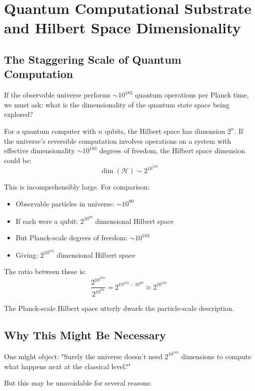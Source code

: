 \section{Quantum Computational Substrate and Hilbert Space Dimensionality}

\subsection{The Staggering Scale of Quantum Computation}

If the observable universe performs $\sim 10^{183}$ quantum operations per Planck time, we must ask: what is the dimensionality of the quantum state space being explored?

For a quantum computer with $n$ qubits, the Hilbert space has dimension $2^n$. If the universe's reversible computation involves operations on a system with effective dimensionality $\sim 10^{183}$ degrees of freedom, the Hilbert space dimension could be:
\begin{equation}
\dim(\mathcal{H}) \sim 2^{10^{183}}
\end{equation}

This is incomprehensibly large. For comparison:
\begin{itemize}
\item Observable particles in universe: $\sim 10^{80}$
\item If each were a qubit: $2^{10^{80}}$ dimensional Hilbert space
\item But Planck-scale degrees of freedom: $\sim 10^{183}$ 
\item Giving: $2^{10^{183}}$ dimensional Hilbert space
\end{itemize}

The ratio between these is:
\begin{equation}
\frac{2^{10^{183}}}{2^{10^{80}}} = 2^{10^{183} - 10^{80}} \approx 2^{10^{183}}
\end{equation}

The Planck-scale Hilbert space utterly dwarfs the particle-scale description.

\subsection{Why This Might Be Necessary}

One might object: "Surely the universe doesn't need $2^{10^{183}}$ dimensions to compute what happens next at the classical level?"

But this may be unavoidable for several reasons:

